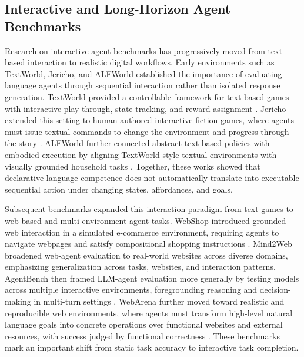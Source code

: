 \documentclass[pdflatex,sn-mathphys-num]{sn-jnl}%
\theoremstyle{thmstyleone}%
\theoremstyle{thmstyletwo}%
\theoremstyle{thmstylethree}%
\begin{document}
\subsection{Interactive and Long-Horizon Agent Benchmarks}
Research on interactive agent benchmarks has progressively moved from text-based interaction to realistic digital workflows. Early environments such as TextWorld, Jericho, and ALFWorld established the importance of evaluating language agents through sequential interaction rather than isolated response generation. TextWorld provided a controllable framework for text-based games with interactive play-through, state tracking, and reward assignment \cite{cote2018textworld}. Jericho extended this setting to human-authored interactive fiction games, where agents must issue textual commands to change the environment and progress through the story \cite{hausknecht2019interactive}. ALFWorld further connected abstract text-based policies with embodied execution by aligning TextWorld-style textual environments with visually grounded household tasks \cite{shridhar2020alfworld}. Together, these works showed that declarative language competence does not automatically translate into executable sequential action under changing states, affordances, and goals.

Subsequent benchmarks expanded this interaction paradigm from text games to web-based and multi-environment agent tasks. WebShop introduced grounded web interaction in a simulated e-commerce environment, requiring agents to navigate webpages and satisfy compositional shopping instructions \cite{yao2022webshop}. Mind2Web broadened web-agent evaluation to real-world websites across diverse domains, emphasizing generalization across tasks, websites, and interaction patterns\cite{deng2023mind2web}. AgentBench then framed LLM-agent evaluation more generally by testing models across multiple interactive environments, foregrounding reasoning and decision-making in multi-turn settings \cite{liu2023agentbench}. WebArena further moved toward realistic and reproducible web environments, where agents must transform high-level natural language goals into concrete operations over functional websites and external resources, with success judged by functional correctness \cite{zhou2023webarena}. These benchmarks mark an important shift from static task accuracy to interactive task completion.
\end{document}
